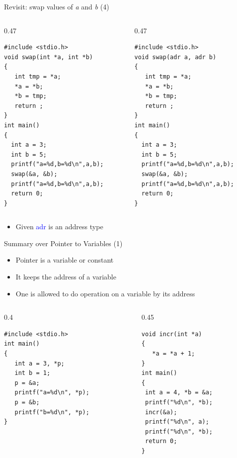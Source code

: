 \begin{frame}[fragile]{Revisit: swap values of \textit{a} and \textit{b} (4)}
\vspace{-0.03in}
\begin{columns}
\begin{column}{0.47\linewidth}
\begin{lstlisting}
#include <stdio.h>
void swap(int *a, int *b)
{
   int tmp = *a;
   *a = *b;
   *b = tmp;
   return ;
}
int main()
{
  int a = 3; 
  int b = 5;
  printf("a=%d,b=%d\n",a,b);
  swap(&a, &b);
  printf("a=%d,b=%d\n",a,b);
  return 0;
}
\end{lstlisting}
\end{column}
\begin{column}{0.47\linewidth}
\begin{lstlisting}[xleftmargin=0.005\linewidth]
#include <stdio.h>
void swap(adr a, adr b)
{
   int tmp = *a;
   *a = *b;
   *b = tmp;
   return ;
}
int main()
{
  int a = 3; 
  int b = 5;
  printf("a=%d,b=%d\n",a,b);
  swap(&a, &b);
  printf("a=%d,b=%d\n",a,b);
  return 0;
}
\end{lstlisting}
\end{column}
\end{columns}
\vspace{-0.1in}
\begin{itemize}
	\item {Given \textcolor{blue}{adr} is an address type}
\end{itemize}
\end{frame}

\begin{frame}[fragile]{Summary over Pointer to Variables (1)}
\vspace{-0.03in}
\begin{itemize}
	\item {Pointer is a variable or constant}
    \item {It keeps the address of a variable}
    \item {One is allowed to do operation on a variable by its address}
\end{itemize}
\begin{columns}
\begin{column}{0.4\linewidth}
\begin{lstlisting}
#include <stdio.h>
int main()
{
   int a = 3, *p;
   int b = 1;
   p = &a;
   printf("a=%d\n", *p);
   p = &b;
   printf("b=%d\n", *p);
}
\end{lstlisting}
\end{column}
\begin{column}{0.45\linewidth}
\begin{lstlisting}
void incr(int *a)
{
   *a = *a + 1;
}
int main()
{
 int a = 4, *b = &a;
 printf("%d\n", *b);
 incr(&a);
 printf("%d\n", a);
 printf("%d\n", *b);
 return 0;
}
\end{lstlisting}
\end{column}
\end{columns}
\end{frame}

